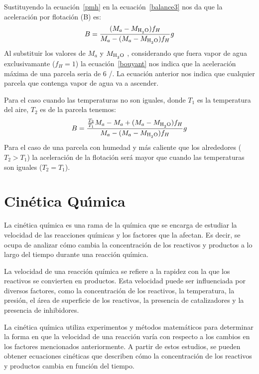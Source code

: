 Sustituyendo la ecuaci\'on~\ref{pmh} en la ecuaci\'on~\ref{balance3} nos da que la aceleraci\'on por flotaci\'on (B) es:
\begin{equation}
B=\frac{(M_a-M_{\ce{H2O}})f_H }{M_a-(M_a-M_{\ce{H2O}})f_H} g
\label{bouyant}
\end{equation}
Al substituir los valores de $M_a$ y $M_{\ce{H2O}}$ , considerando que fuera  vapor de agua exclusivamante ($f_H=1$) la ecuaci\'on~\ref{bouyant} nos indica que la aceleraci\'on m\'axima de una parcela seria de  $6$ \metre/\square\second . La ecuaci\'on anterior nos indica que cualquier parcela que contenga vapor de agua va a ascender.

Para el caso cuando las temperaturas no son iguales,  donde $T_1$ es la temperatura del aire, $T_2$ es de la parcela tenemos:
\begin{equation}
B=\frac{\frac{T_2}{T_1}M_a-M_a+(M_a-M_{\ce{H2O}})f_H }{M_a-(M_a-M_{\ce{H2O}})f_H} g
\label{bouyant2}
\end{equation}
Para el caso de una parcela con humedad y m\'as caliente que los alrededores ($T_2>T_1$) la aceleraci\'on de la flotaci\'on ser\'a mayor que cuando las temperaturas son iguales ($T_2=T_1$). 

\section[Cin\'etica]{Cin\'etica Qu\'{\i}mica}
\label{cineq}

La cinética química es una rama de la química que se encarga de estudiar la velocidad de las reacciones químicas y los factores que la afectan. Es decir, se ocupa de analizar cómo cambia la concentración de los reactivos y productos a lo largo del tiempo durante una reacción química.

La velocidad de una reacción química se refiere a la rapidez con la que los reactivos se convierten en productos. Esta velocidad puede ser influenciada por diversos factores, como la concentración de los reactivos, la temperatura, la presión, el área de superficie de los reactivos, la presencia de catalizadores y la presencia de inhibidores.

La cinética química utiliza experimentos y métodos matemáticos para determinar la forma en que la velocidad de una reacción varía con respecto a los cambios en los factores mencionados anteriormente. A partir de estos estudios, se pueden obtener ecuaciones cinéticas que describen cómo la concentración de los reactivos y productos cambia en función del tiempo.

